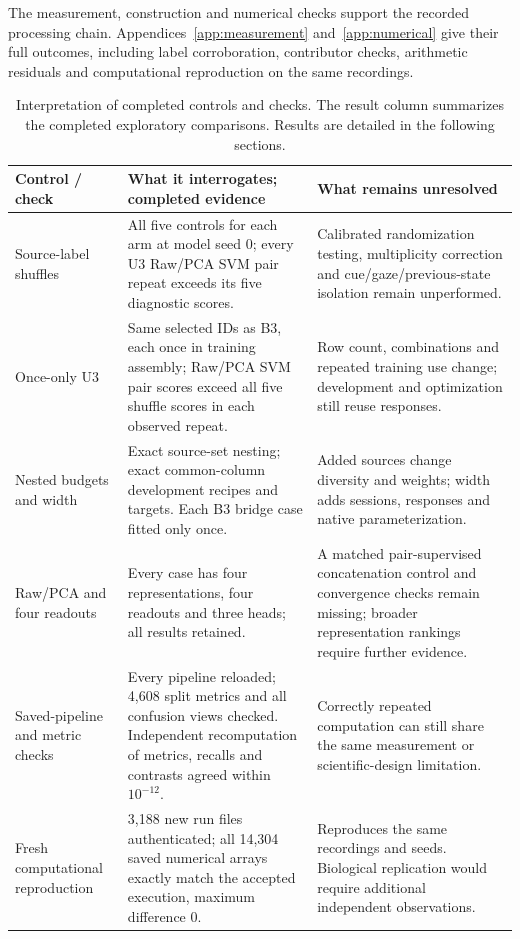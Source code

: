 \documentclass[10pt,a4paper]{article}
\begin{document}
The measurement, construction and numerical checks support the recorded processing chain. Appendices~\ref{app:measurement} and~\ref{app:numerical} give their full outcomes, including label corroboration, contributor checks, arithmetic residuals and computational reproduction on the same recordings.

\begin{table}[h!]
\caption{Interpretation of completed controls and checks. The result column summarizes the completed exploratory comparisons. Results are detailed in the following sections.}
\label{tab:controls}\small
\begin{tabularx}{\linewidth}{L{31mm}Y Y}
\toprule
Control / check & What it interrogates; completed evidence & What remains unresolved \\
\midrule
Source-label shuffles & All five controls for each arm at model seed 0; every U3 Raw/PCA SVM pair repeat exceeds its five diagnostic scores. & Calibrated randomization testing, multiplicity correction and cue/gaze/previous-state isolation remain unperformed. \\
Once-only U3 & Same selected IDs as B3, each once in training assembly; Raw/PCA SVM pair scores exceed all five shuffle scores in each observed repeat. & Row count, combinations and repeated training use change; development and optimization still reuse responses. \\
Nested budgets and width & Exact source-set nesting; exact common-column development recipes and targets. Each B3 bridge case fitted only once. & Added sources change diversity and weights; width adds sessions, responses and native parameterization. \\
Raw/PCA and four readouts & Every case has four representations, four readouts and three heads; all results retained. & A matched pair-supervised concatenation control and convergence checks remain missing; broader representation rankings require further evidence. \\
Saved-pipeline and metric checks & Every pipeline reloaded; 4,608 split metrics and all confusion views checked. Independent recomputation of metrics, recalls and contrasts agreed within $10^{-12}$. & Correctly repeated computation can still share the same measurement or scientific-design limitation. \\
Fresh computational reproduction & 3,188 new run files authenticated; all 14,304 saved numerical arrays exactly match the accepted execution, maximum difference 0. & Reproduces the same recordings and seeds. Biological replication would require additional independent observations. \\
\bottomrule
\end{tabularx}
\end{table}
\end{document}
